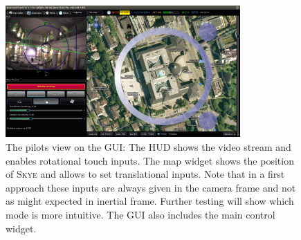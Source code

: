 \begin{figure}[H] %
	\begin{center}
		\includegraphics[width=0.8\textwidth]{qgc_manual_control}
		\caption[Manual control view of Graphical User Interface]{The pilots view on the GUI\footnotemark : The HUD shows the video stream and enables rotational touch inputs. The map widget shows the position of \textsc{Skye} and allows to set translational inputs. Note that in a first approach these inputs are always given in the camera frame and not as might expected in inertial frame. Further testing will show which mode is more intuitive. The GUI also includes the main control widget.}  
		\label{figure:qgc_manual_control}		
	\end{center}
\end{figure}

